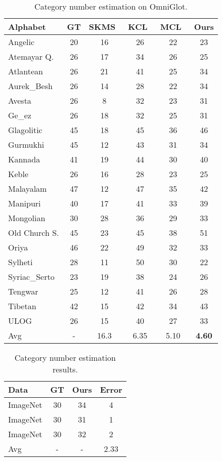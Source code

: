 \begin{table}[ht]
\footnotesize
\centering
\caption{Category number estimation on OmniGlot.}\label{tab:omniglot_k_est}
\setlength\tabcolsep{1pt}
\begin{tabular}{lccccc}
\toprule
Alphabet      & GT & SKMS~\cite{Anand14_SKMS} & KCL~\cite{Hsu18_L2C} & MCL~\cite{Hsu19_MCL}  & Ours \\
\midrule
Angelic & 20 & 16 & 26 & 22 & 23\\
Atemayar Q. & 26 & 17 & 34 & 26 & 25\\
Atlantean & 26 & 21 & 41 & 25 & 34\\
Aurek\_Besh & 26 & 14 & 28 & 22 & 34\\
Avesta & 26 & 8 & 32 & 23 & 31\\
Ge\_ez & 26 & 18 & 32 & 25 & 31\\
Glagolitic & 45 & 18 & 45 & 36 & 46\\
Gurmukhi & 45 & 12 & 43 & 31 & 34\\
Kannada & 41 & 19 & 44 & 30 & 40\\
Keble & 26 & 16 & 28 & 23 & 25\\
Malayalam & 47 & 12 & 47 & 35 & 42\\
Manipuri & 40 & 17 & 41 & 33 & 39\\
Mongolian & 30 & 28 & 36 & 29 & 33\\
Old Church S. & 45 & 23 & 45 & 38 & 51\\
Oriya & 46 & 22 & 49 & 32 & 33\\
Sylheti & 28 & 11 & 50 & 30 & 22\\
Syriac\_Serto & 23 & 19 & 38 & 24 & 26\\
Tengwar & 25 & 12 & 41 & 26 & 28\\
Tibetan & 42 & 15 & 42 & 34 & 43\\
ULOG & 26 & 15 & 40 & 27 & 33\\
\midrule
Avg & - & 16.3 & 6.35 & 5.10 & \textbf{4.60} \\
\bottomrule
\end{tabular}
\end{table}

\begin{table}[ht]
\centering
\footnotesize
\caption{Category number estimation results.}\label{tab:imagenet_k_est}
\begin{tabular}{lccc}
\toprule
Data & GT  & Ours & Error \\
\midrule
ImageNet & 30 & 34 & 4\\
ImageNet & 30 & 31 & 1\\
ImageNet & 30 & 32 & 2\\
\midrule
Avg & - & - & 2.33\\
\bottomrule
\end{tabular}
\end{table}

